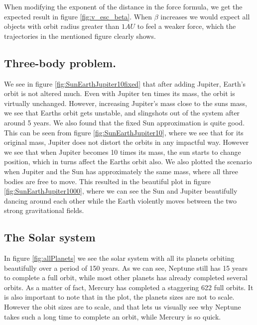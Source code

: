 \documentclass[../main.tex]{subfiles}
\begin{document}
When modifying the exponent of the distance in the force formula, we get the expected result in figure \ref{fig:v_esc_beta}. When $\beta$ increases we would expect all objects with orbit radius greater than $1AU$ to feel a weaker force, which the trajectories in the mentioned figure clearly shows.

\subsection{Three-body problem.}
We see in figure \ref{fig:SunEarthJupiter10fixed} that after adding Jupiter, Earth's orbit is not altered much. Even with Jupiter ten times its mass, the orbit is virtually unchanged. However, increasing Jupiter's mass close to the suns mass, we see that Earths orbit gets unstable, and slingshots out of the system after around 5 years.
We also found that the fixed Sun approximation is quite good. This can be seen from figure \ref{fig:SunEarthJupiter10}, where we see that for its original mass, Jupiter does not distort the orbits in any impactful way. However we see that when Jupiter becomes 10 times its mass, the sun starts to change position, which in turns affect the Earths orbit also. We also plotted the scenario when Jupiter and the Sun has approximately the same mass, where all three bodies are free to move. This resulted in the beautiful plot in figure \ref{fig:SunEarthJupiter1000}, where we can see the Sun and Jupiter beautifully dancing around each other while the Earth violently moves between the two strong gravitational fields.

\subsection{The Solar system}
In figure \ref{fig:allPlanets} we see the solar system with all its planets orbiting beautifully over a period of 150 years. As we can see, Neptune still has 15 years to complete a full orbit, while most other planets has already completed several orbits. As a matter of fact, Mercury has completed a staggering 622 full orbits.
It is also important to note that in the plot, the planets sizes are not to scale. However the obit sizes are to scale, and that lets us visually see why Neptune takes such a long time to complete an orbit, while Mercury is so quick.
\iffalse
When making a simulation of the different planets in our Solar system, it would be strange if we did not look at the whole system together. The orbit of all the planets in The Solar system is plotted in figure \ref{fig:allPlanets}. As expected(studied in real life) they all move around the Sun in a somewhat circular/elliptical orbit during our simulation.
\fi
\end{document}
